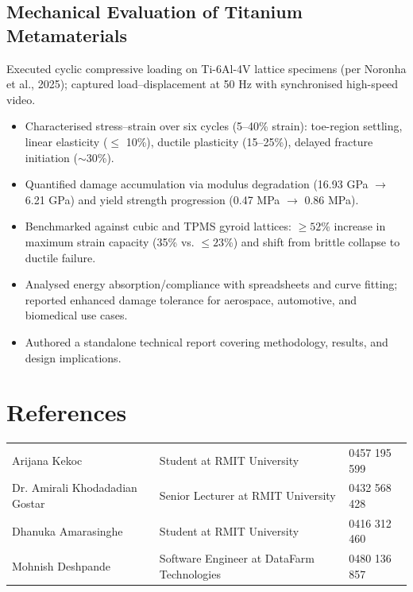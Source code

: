 \documentclass[11pt,a4paper]{article}
\begin{document}
\subsection{Mechanical Evaluation of Titanium Metamaterials}
Executed cyclic compressive loading on Ti-6Al-4V lattice specimens (per Noronha et al., 2025); captured load--displacement at 50 Hz with synchronised high-speed video.
\begin{itemize}
    \item Characterised stress--strain over six cycles (5--40\% strain): toe-region settling, linear elasticity ($\le$ 10\%), ductile plasticity (15--25\%), delayed fracture initiation ($\sim 30$\%).
    \item Quantified damage accumulation via modulus degradation (16.93 GPa $\rightarrow$ 6.21 GPa) and yield strength progression (0.47 MPa $\rightarrow$ 0.86 MPa).
    \item Benchmarked against cubic and TPMS gyroid lattices: $\ge 52$\% increase in maximum strain capacity (35\% vs. $\le 23$\%) and shift from brittle collapse to ductile failure.
    \item Analysed energy absorption/compliance with spreadsheets and curve fitting; reported enhanced damage tolerance for aerospace, automotive, and biomedical use cases.
    \item Authored a standalone technical report covering methodology, results, and design implications.
\end{itemize}

\section{References}
\begin{flushleft}
    \begin{tabular}{@{}lll@{}}
        Arijana Kekoc & Student at RMIT University & 0457 195 599 \\
        Dr. Amirali Khodadadian Gostar  & Senior Lecturer at RMIT University  & 0432 568 428 \\
        Dhanuka Amarasinghe & Student at RMIT University & 0416 312 460 \\
        Mohnish Deshpande & Software Engineer at DataFarm Technologies & 0480 136 857 \\
    \end{tabular}
\end{flushleft}
\end{document}
